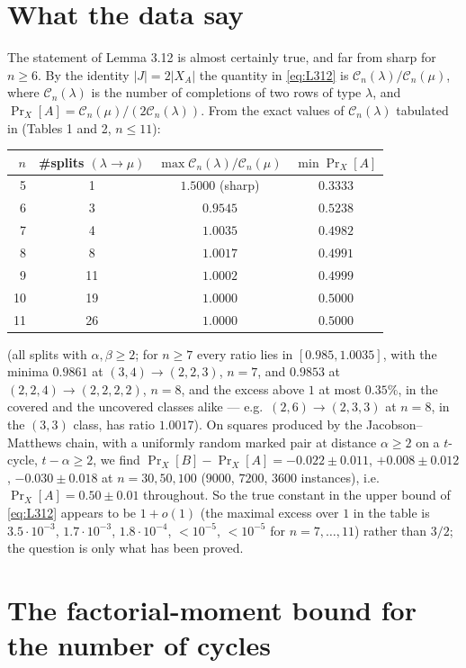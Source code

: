 \documentclass[11pt]{article}
\theoremstyle{remark}
\newcommand{\CC}{\mathcal C}
\begin{document}
\section{What the data say}

The statement of Lemma 3.12 is almost certainly true, and far from
sharp for $n\ge6$.  By the identity $|J|=2|X_A|$ the quantity in
\eqref{eq:L312} is $\CC_n(\lambda)/\CC_n(\mu)$, where $\CC_n(\lambda)$
is the number of completions of two rows of type $\lambda$, and
$\Pr_X[A]=\CC_n(\mu)/(2\CC_n(\lambda))$.  From the exact values of
$\CC_n(\lambda)$ tabulated in \cite{CGW08} (Tables 1 and 2, $n\le11$):

\begin{center}
\begin{tabular}{@{}rccc@{}}
\toprule
$n$ & \#splits $(\lambda\to\mu)$ & $\max\CC_n(\lambda)/\CC_n(\mu)$ & $\min\Pr_X[A]$\\
\midrule
5 & 1 & $1.5000$ (sharp) & $0.3333$\\
6 & 3 & $0.9545$ & $0.5238$\\
7 & 4 & $1.0035$ & $0.4982$\\
8 & 8 & $1.0017$ & $0.4991$\\
9 & 11 & $1.0002$ & $0.4999$\\
10 & 19 & $1.0000$ & $0.5000$\\
11 & 26 & $1.0000$ & $0.5000$\\
\bottomrule
\end{tabular}
\end{center}
\noindent (all splits with $\alpha,\beta\ge2$; for $n\ge7$ every ratio
lies in $[0.985,1.0035]$, with the minima $0.9861$ at
$(3,4)\to(2,2,3)$, $n=7$, and $0.9853$ at $(2,2,4)\to(2,2,2,2)$, $n=8$,
and the excess above $1$ at most $0.35\%$, in the covered and the
uncovered classes alike --- e.g.\ $(2,6)\to(2,3,3)$ at $n=8$, in the
$(3,3)$ class, has ratio $1.0017$).  On squares produced by the Jacobson--Matthews chain, with
a uniformly random marked pair at distance $\alpha\ge2$ on a
$t$-cycle, $t-\alpha\ge2$, we find
$\Pr_X[B]-\Pr_X[A]=-0.022\pm0.011$, $+0.008\pm0.012$, $-0.030\pm0.018$
at $n=30,50,100$ ($9000$, $7200$, $3600$ instances), i.e.\
$\Pr_X[A]=0.50\pm0.01$ throughout.  So the true constant in the upper
bound of \eqref{eq:L312} appears to be $1+o(1)$ (the maximal excess
over $1$ in the table is $3.5\cdot10^{-3}$, $1.7\cdot10^{-3}$,
$1.8\cdot10^{-4}$, $<10^{-5}$, $<10^{-5}$ for $n=7,\dots,11$) rather
than $3/2$; the question is only what has been proved.

\appendix
\section{The factorial-moment bound for the number of cycles}
\end{document}
